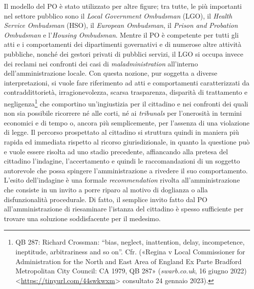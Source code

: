 \documentclass[12pt,it,a4paper,]{report}
\begin{document}
Il modello del PO è stato utilizzato per altre figure; tra tutte, le più
importanti nel settore pubblico sono il \emph{Local Government
Ombudsman} (LGO), il \emph{Health Service Ombudsman} (HSO), il
\emph{European Ombudsman}, il \emph{Prison and Probation Ombudsman} e
l'\emph{Housing Ombudsman}. Mentre il PO è competente per tutti gli atti
e i comportamenti dei dipartimenti governativi e di numerose altre
attività pubbliche, nonché dei gestori privati di pubblici servizi, il
LGO si occupa invece dei reclami nei confronti dei casi di
\emph{maladministration} all'interno dell'amministrazione locale. Con
questa nozione, pur soggetta a diverse interpretazioni, si vuole fare
riferimento ad atti e comportamenti caratterizzati da contraddittorietà,
irragionevolezza, scarsa trasparenza, disparità di trattamento e
negligenza\footnote{QB 287: Richard Crossman: ``bias, neglect,
  inattention, delay, incompetence, ineptitude, arbitrariness and so
  on''. Cfr. ({«Regina v Local Commissioner for Administration for the
  North and East Area of England Ex Parte Bradford Metropolitan City
  Council: CA 1979, QB 287»} (\emph{swarb.co.uk}, 16 giugno 2022)
  \textless{}\url{https://tinyurl.com/44swkwxm}\textgreater{} consultato
  24 gennaio 2023).} che comportino un'ingiustizia per il cittadino e
nei confronti dei quali non sia possibile ricorrere né alle corti, né ai
\emph{tribunals} per l'onerosità in termini economici e di tempo o,
ancora più semplicemente, per l'assenza di una violazione di legge. Il
percorso prospettato al cittadino si struttura quindi in maniera più
rapida ed immediata rispetto al ricorso giurisdizionale, in quanto la
questione può e vuole essere risolta ad uno stadio precedente,
affiancando alla pretesa del cittadino l'indagine, l'accertamento e
quindi le raccomandazioni di un soggetto autorevole che possa spingere
l'amministrazione a rivedere il suo comportamento. L'esito dell'indagine
è una formale \emph{recommendation} rivolta all'amministrazione che
consiste in un invito a porre riparo al motivo di doglianza o alla
disfunzionalità procedurale. Di fatto, il semplice invito fatto dal PO
all'amministrazione di riesaminare l'istanza del cittadino è spesso
sufficiente per trovare una soluzione soddisfacente per il medesimo.
\end{document}
